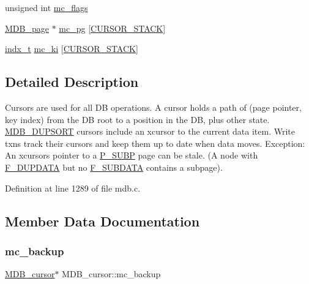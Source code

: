 \begin{DoxyCompactItemize}
unsigned int \mbox{\hyperlink{struct_m_d_b__cursor_a9af6c760c16043b451b8592f8d1690c0}{mc\+\_\+flags}}
\item 
\mbox{\hyperlink{struct_m_d_b__page}{M\+D\+B\+\_\+page}} $\ast$ \mbox{\hyperlink{struct_m_d_b__cursor_a38c7d46de8e44dd644ae28fb18e0eef0}{mc\+\_\+pg}} \mbox{[}\mbox{\hyperlink{group__internal_gaef453f149efb721c2eb311a6ede48dc8}{C\+U\+R\+S\+O\+R\+\_\+\+S\+T\+A\+CK}}\mbox{]}
\item 
\mbox{\hyperlink{group__internal_ga730e17f748208d77496ebd895c8375dc}{indx\+\_\+t}} \mbox{\hyperlink{struct_m_d_b__cursor_a8f1d553e9b663b477ad2f2e0c2483cea}{mc\+\_\+ki}} \mbox{[}\mbox{\hyperlink{group__internal_gaef453f149efb721c2eb311a6ede48dc8}{C\+U\+R\+S\+O\+R\+\_\+\+S\+T\+A\+CK}}\mbox{]}
\end{DoxyCompactItemize}


\subsection{Detailed Description}
Cursors are used for all DB operations. A cursor holds a path of (page pointer, key index) from the DB root to a position in the DB, plus other state. \mbox{\hyperlink{group__mdb__dbi__open_gae0626566c2562e9007f5c8c9535bab1a}{M\+D\+B\+\_\+\+D\+U\+P\+S\+O\+RT}} cursors include an xcursor to the current data item. Write txns track their cursors and keep them up to date when data moves. Exception\+: An xcursor\textquotesingle{}s pointer to a \mbox{\hyperlink{group__mdb__page_ga77cc6dc98fda40c81fb2f75068fb5551}{P\+\_\+\+S\+U\+BP}} page can be stale. (A node with \mbox{\hyperlink{group__mdb__node_ga6e93fc5b62c03a0b85d0755b7d19bee5}{F\+\_\+\+D\+U\+P\+D\+A\+TA}} but no \mbox{\hyperlink{group__mdb__node_ga5323896692f7418870f72d7a5f1b2bab}{F\+\_\+\+S\+U\+B\+D\+A\+TA}} contains a subpage). 

Definition at line 1289 of file mdb.\+c.



\subsection{Member Data Documentation}
\mbox{\label{struct_m_d_b__cursor_a128b96da79453c2cadfebe649094276f}} 
\subsubsection{\texorpdfstring{mc\+\_\+backup}{mc\_backup}}
{\footnotesize\ttfamily \mbox{\hyperlink{struct_m_d_b__cursor}{M\+D\+B\+\_\+cursor}}$\ast$ M\+D\+B\+\_\+cursor\+::mc\+\_\+backup}

